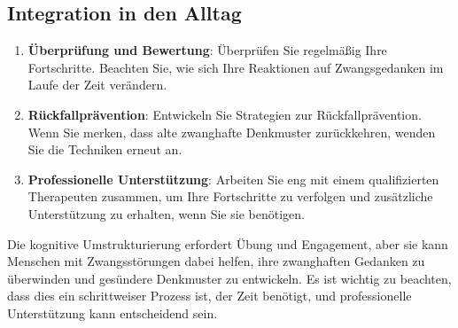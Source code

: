 \subsection{Integration in den Alltag}

\begin{enumerate}
  \item \textbf{Überprüfung und Bewertung}: Überprüfen Sie regelmäßig Ihre Fortschritte. Beachten Sie, wie sich Ihre Reaktionen auf Zwangsgedanken im Laufe der Zeit verändern.
  
  \item \textbf{Rückfallprävention}: Entwickeln Sie Strategien zur Rückfallprävention. Wenn Sie merken, dass alte zwanghafte Denkmuster zurückkehren, wenden Sie die Techniken erneut an.
  
  \item \textbf{Professionelle Unterstützung}: Arbeiten Sie eng mit einem qualifizierten Therapeuten zusammen, um Ihre Fortschritte zu verfolgen und zusätzliche Unterstützung zu erhalten, wenn Sie sie benötigen.
\end{enumerate}

Die kognitive Umstrukturierung erfordert Übung und Engagement, aber sie kann Menschen mit Zwangsstörungen dabei helfen, ihre zwanghaften Gedanken zu überwinden und gesündere Denkmuster zu entwickeln. Es ist wichtig zu beachten, dass dies ein schrittweiser Prozess ist, der Zeit benötigt, und professionelle Unterstützung kann entscheidend sein.
